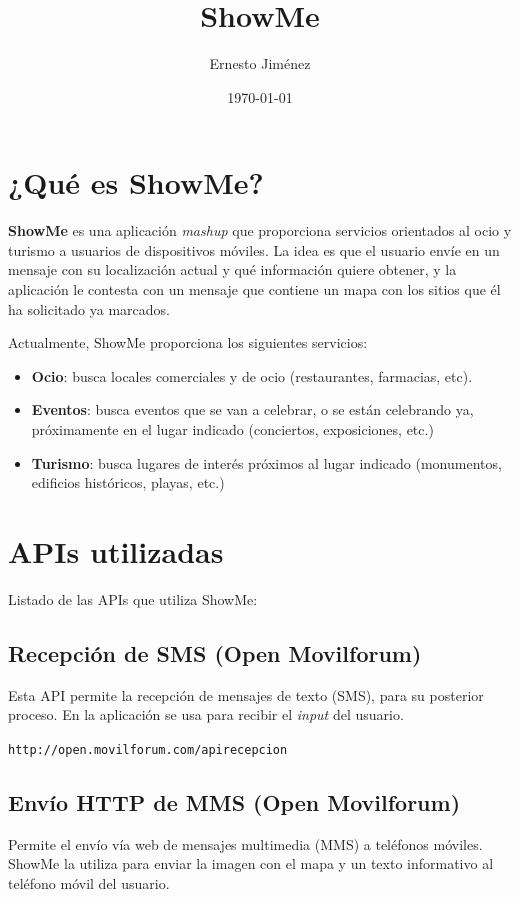 \documentclass[11pt, a4paper, oneside]{article}
\title{ShowMe}
\author{Ernesto Jiménez}
\date{\today}                                           %
\begin{document}
\maketitle

\section{¿Qué es ShowMe?}

\textbf{ShowMe} es una aplicación \emph{mashup} que proporciona servicios orientados al ocio y turismo a usuarios de dispositivos móviles. La idea es que el usuario envíe en un mensaje con su localización actual y qué información quiere obtener, y la aplicación le contesta con un mensaje que contiene un mapa con los sitios que él ha solicitado ya marcados.

Actualmente, ShowMe proporciona los siguientes servicios:

\begin{itemize}
	\item \textbf{Ocio}: busca locales comerciales y de ocio (restaurantes, farmacias, etc).
	\item \textbf{Eventos}: busca eventos que se van a celebrar, o se están celebrando ya, próximamente en el lugar indicado (conciertos, exposiciones, etc.)
	\item \textbf{Turismo}: busca lugares de interés próximos al lugar indicado (monumentos, edificios históricos, playas, etc.)
\end{itemize}

\section{APIs utilizadas}

Listado de las APIs que utiliza ShowMe:

\subsection*{Recepción de SMS (Open Movilforum)}
Esta API permite la recepción de mensajes de texto (SMS), para su posterior proceso. En la aplicación se usa para recibir el \emph{input} del usuario.

\texttt{http://open.movilforum.com/apirecepcion}

\subsection*{Envío HTTP de MMS (Open Movilforum)}
Permite el envío vía web de mensajes multimedia (MMS) a teléfonos móviles. ShowMe la utiliza para enviar la imagen con el mapa y un texto informativo al teléfono móvil del usuario.
\end{document}
